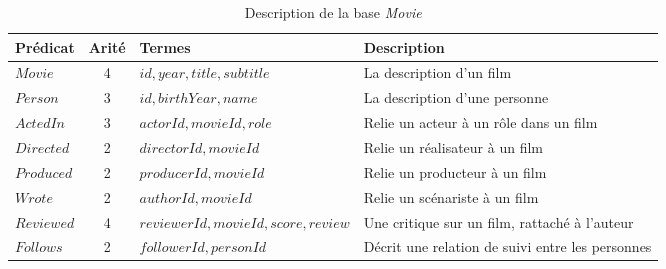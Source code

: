 \begin{table}[H]
    \centering
    \begin{adjustbox}{max width=\linewidth}
        \begin{tabular}{l|c|l|l}
            Prédicat   & Arité & Termes                               & Description                                      \\
            \hline
            \hline
            $Movie$    & 4     & $id, year, title, subtitle$          & La description d'un film                         \\
            $Person$   & 3     & $id, birthYear, name$                & La description d'une personne                    \\
            $ActedIn$  & 3     & $actorId, movieId, role$             & Relie un acteur à un rôle dans un film           \\
            $Directed$ & 2     & $directorId, movieId$                & Relie un réalisateur à un film                   \\
            $Produced$ & 2     & $producerId, movieId$                & Relie un producteur à un film                    \\
            $Wrote$    & 2     & $authorId, movieId$                  & Relie un scénariste à un film                    \\
            $Reviewed$ & 4     & $reviewerId, movieId, score, review$ & Une critique sur un film, rattaché à l'auteur    \\
            $Follows$  & 2     & $followerId, personId$               & Décrit une relation de suivi entre les personnes \\
        \end{tabular}
    \end{adjustbox}
    \caption{Description de la base \emph{Movie}}
\end{table}

